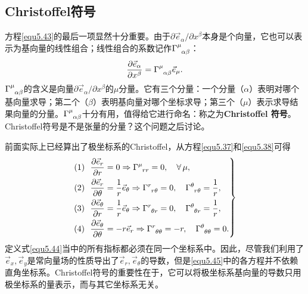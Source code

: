 \subsection*{Christoffel符号}
方程\eqref{equ5.43}的最后一项显然十分重要。由于$\partial \vec{e}_\alpha / \partial x^\beta$本身是个向量，它也可以表示为基向量的线性组合；线性组合的系数记作$\Gamma\indices{^\mu_{\alpha \beta}}$：
\begin{equation}
    \frac{\partial \vec{e}_\alpha}{\partial x^\beta} = \Gamma\indices{^\mu_{\alpha \beta}} \vec{e}_\mu.
\label{equ5.44}
\end{equation}
$\Gamma\indices{^\mu_{\alpha \beta}}$的含义是向量$\partial \vec{e}_\alpha / \partial x^\beta$的$\mu$分量。它有三个分量：一个分量（$\alpha$）表明对哪个基向量求导；第二个（$\beta$）表明基向量对哪个坐标求导；第三个（$\mu$）表示求导结果向量的分量。$\Gamma\indices{^\mu_{\alpha \beta}}$十分有用，值得给它进行命名：称之为\textbf{Christoffel 符号}。Christoffel符号是不是张量的分量？这个问题之后讨论。

前面实际上已经算出了极坐标系的Christoffel，从方程\eqref{equ5.37}和\eqref{equ5.38}可得
\begin{equation}
\left.
\begin{split}
    (1)\ \ \dfrac{\partial \vec{e}_r}{\partial r} &= 0  \Rightarrow \Gamma\indices{^\mu_{rr}} = 0, \quad \forall\, \mu, \\
    (2)\ \  \dfrac{\partial \vec{e}_r}{\partial \theta} &= \dfrac{1}{r} \vec{e}_\theta \Rightarrow  \Gamma\indices{^r_{r\theta}} = 0, \quad \Gamma\indices{^\theta_{r \theta}} = \dfrac{1}{r}, \\
    (3)\ \  \dfrac{\partial \vec{e}_\theta}{\partial r} &= \dfrac{1}{r} \vec{e}_\theta \Rightarrow \Gamma\indices{^r_{\theta r}} = 0, \quad \Gamma\indices{^\theta_{\theta r}} = \dfrac{1}{r}, \\
    (4)\ \  \dfrac{\partial \vec{e}_\theta}{\partial \theta} &= -r \vec{e}_r \Rightarrow \Gamma\indices{^r_{\theta \theta}} = -r, \quad \Gamma\indices{^\theta_{\theta \theta}} = 0.
\end{split}
\right\}
\label{equ5.45}
\end{equation}
定义式\eqref{equ5.44}当中的所有指标都必须在同一个坐标系中。因此，尽管我们利用了$\vec{e}_x, \vec{e}_y$是常向量场的性质导出了$\vec{e}_r, \vec{e}_\theta$的导数，但是\eqref{equ5.45}中的各方程并不依赖直角坐标系。Christoffel符号的重要性在于，它可以将极坐标系基向量的导数只用极坐标系的量表示，而与其它坐标系无关。

